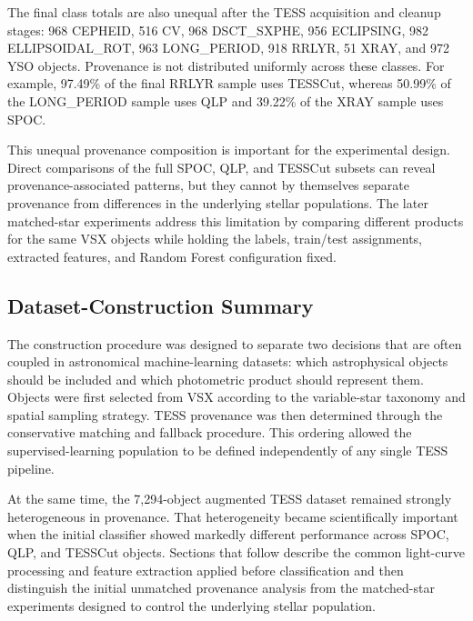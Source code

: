 \documentclass[linenumbers]{aastex701}
\begin{document}
The final class totals are also unequal after the TESS acquisition and cleanup stages: 968 CEPHEID, 516 CV, 968 DSCT\_SXPHE, 956 ECLIPSING, 982 ELLIPSOIDAL\_ROT, 963 LONG\_PERIOD, 918 RRLYR, 51 XRAY, and 972 YSO objects. Provenance is not distributed uniformly across these classes. For example, 97.49\% of the final RRLYR sample uses TESSCut, whereas 50.99\% of the LONG\_PERIOD sample uses QLP and 39.22\% of the XRAY sample uses SPOC.

This unequal provenance composition is important for the experimental design. Direct comparisons of the full SPOC, QLP, and TESSCut subsets can reveal provenance-associated patterns, but they cannot by themselves separate provenance from differences in the underlying stellar populations. The later matched-star experiments address this limitation by comparing different products for the same VSX objects while holding the labels, train/test assignments, extracted features, and Random Forest configuration fixed.

\subsection{Dataset-Construction Summary}
\label{subsec:dataset_summary}

The construction procedure was designed to separate two decisions that are often coupled in astronomical machine-learning datasets: which astrophysical objects should be included and which photometric product should represent them. Objects were first selected from VSX according to the variable-star taxonomy and spatial sampling strategy. TESS provenance was then determined through the conservative matching and fallback procedure. This ordering allowed the supervised-learning population to be defined independently of any single TESS pipeline.

At the same time, the 7,294-object augmented TESS dataset remained strongly heterogeneous in provenance. That heterogeneity became scientifically important when the initial classifier showed markedly different performance across SPOC, QLP, and TESSCut objects. Sections that follow describe the common light-curve processing and feature extraction applied before classification and then distinguish the initial unmatched provenance analysis from the matched-star experiments designed to control the underlying stellar population.

\end{document}
